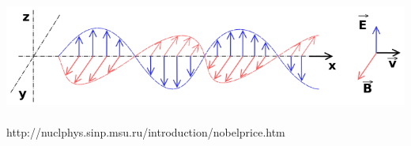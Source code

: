 \documentclass[a4paper,14pt, openany, twoside, draft]{extbook} %
\begin{document}
 \includegraphics[width=14.713cm,height=3.627cm]{EMRad-img003.png}

http://nuclphys.sinp.msu.ru/introduction/nobelprice.htm
\end{document}
